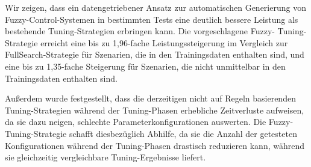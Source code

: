 Wir zeigen, dass ein datengetriebener Ansatz zur automatischen Generierung von Fuzzy-Control-Systemen in bestimmten Tests eine deutlich bessere Leistung als bestehende Tuning-Strategien erbringen kann. Die vorgeschlagene Fuzzy- Tuning-Strategie erreicht eine bis zu 1,96-fache Leistungssteigerung im Vergleich zur FullSearch-Strategie für Szenarien, die in den Trainingsdaten enthalten sind, und eine bis zu 1,35-fache Steigerung für Szenarien, die nicht unmittelbar in den Trainingsdaten enthalten sind.

Außerdem wurde festgestellt, dass die derzeitigen nicht auf Regeln basierenden Tuning-Strategien während der Tuning-Phasen erhebliche Zeitverluste aufweisen, da sie dazu neigen, schlechte Parameterkonfigurationen auswerten. Die Fuzzy-Tuning-Strategie schafft diesbezüglich Abhilfe, da sie die Anzahl der getesteten Konfigurationen während der Tuning-Phasen drastisch reduzieren kann, während sie gleichzeitig vergleichbare Tuning-Ergebnisse liefert.


\cleardoublepage